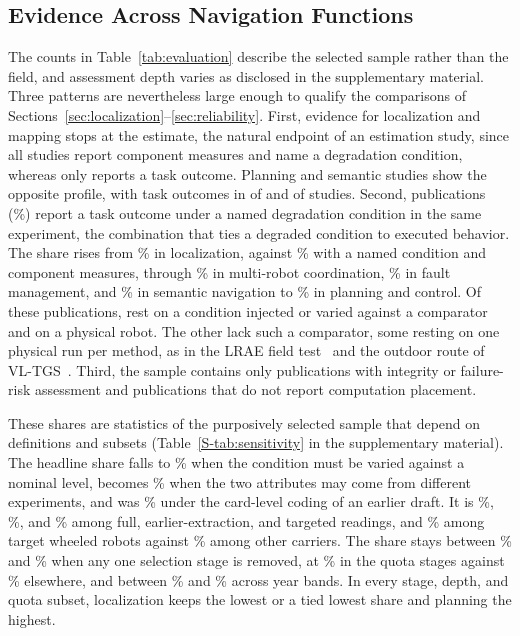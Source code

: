 \subsection{Evidence Across Navigation Functions}

The counts in Table~\ref{tab:evaluation} describe the selected sample rather than the field, and assessment depth varies as disclosed in the supplementary material. Three patterns are nevertheless large enough to qualify the comparisons of Sections~\ref{sec:localization}--\ref{sec:reliability}. First, evidence for localization and mapping stops at the estimate, the natural endpoint of an estimation study, since all \LocTechCount{} studies report component measures and \LocNamedCount{} name a degradation condition, whereas only \LocTaskCount{} reports a task outcome. Planning and semantic studies show the opposite profile, with task outcomes in \PlnTaskCount{} of \PlnTechCount{} and \SemTaskCount{} of \SemTechCount{} studies. Second, \DegTaskCount{} publications (\DegTaskShare\%) report a task outcome under a named degradation condition in the same experiment, the combination that ties a degraded condition to executed behavior. The share rises from \LocSameShare\% in localization, against \LocNamedShare\% with a named condition and component measures, through \MrcSameShare\% in multi-robot coordination, \RelSameShare\% in fault management, and \SemSameShare\% in semantic navigation to \PlnSameShare\% in planning and control. Of these publications, \DOneSameCount{} rest on a condition injected or varied against a comparator and \PhysSameCount{} on a physical robot. The other \DTwoSameCount{} lack such a comparator, some resting on one physical run per method, as in the LRAE field test~\cite{P_M14} and the outdoor route of VL-TGS~\cite{P_F05}. Third, the sample contains only \IntegrityCount{} publications with integrity or failure-risk assessment and \ComputeUnreported{} publications that do not report computation placement.

These shares are statistics of the purposively selected sample that depend on definitions and subsets (Table~\ref{S-tab:sensitivity} in the supplementary material). The headline share falls to \DOneNominalShare\% when the condition must be varied against a nominal level, becomes \AnyUnitShare\% when the two attributes may come from different experiments, and was \DegTaskShareCard\% under the card-level coding of an earlier draft. It is \DepthFullShare\%, \DepthLegacyShare\%, and \DepthTargetedShare\% among full, earlier-extraction, and targeted readings, and \WhlShare\% among target wheeled robots against \NonWhlShare\% among other carriers. The share stays between \StageMinShare\% and \StageMaxShare\% when any one selection stage is removed, at \QuotaShare\% in the quota stages against \NonQuotaShare\% elsewhere, and between \YearMinShare\% and \YearMaxShare\% across year bands. In every stage, depth, and quota subset, localization keeps the lowest or a tied lowest share and planning the highest.

